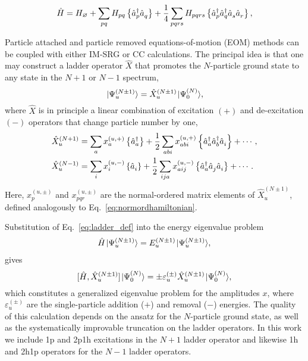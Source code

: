 \documentclass[thesis.tex]{subfiles}
\begin{document}
\begin{align}
  \hat{H} = H_\varnothing + \sum_{p q} H_{p q} \left\{\hat{a}_p^\dagger \hat{a}_q^{}\right\} + \frac{1}{4} \sum_{p q r s} H_{p q r s} \left\{\hat{a}_p^\dagger \hat{a}_q^\dagger \hat{a}_s^{} \hat{a}_r^{}\right\},
  \label{eq:normordhamiltonian}
\end{align}


Particle attached and particle removed equations-of-motion (EOM) methods can be coupled with either IM-SRG or CC calculations. The principal idea is that one may construct a ladder operator $\hat{X}$ that promotes the $N$-particle ground state to any state in the $N + 1$ or $N - 1$ spectrum,
\begin{equation}\label{eq:ladder_def}
  \hspace{1pt}\lvert \Psi^{(N \pm 1)}_u \rangle  = \hat{X}^{(N \pm 1)}_u \hspace{1pt}\lvert \Psi^{(N)}_0 \rangle,
\end{equation}
where $\hat{X}$ is in principle a linear combination of excitation $(+)$ and de-excitation $(-)$ operators that change particle number by one,
\begin{align}
  \label{eq:gen_attached}
  \hat{X}^{(N + 1)}_u &= \sum_a x^{(u, +)}_a  \left\{\hat{a}^\dagger_a\right\} + \frac{1}{2} \sum_{a b i} x^{(u, +)}_{a b i} \left\{\hat{a}^\dagger_a \hat{a}^\dagger_b \hat{a}_i^{}\right\} + \cdots,  \\
  \label{eq:gen_removed}
  \hat{X}^{(N - 1)}_u &= \sum_i x_i^{(u, -)} \left\{\hat{a}_i^{}\right\} + \frac{1}{2} \sum_{i j a} x^{(u, -)}_{a i j} \left\{\hat{a}^\dagger_a \hat{a}_j^{} \hat{a}_i^{}\right\}  + \cdots.
\end{align}
Here, $x^{(u, \pm)}_p$ and $x^{(u, \pm)}_{p q r}$ are the normal-ordered matrix elements of $\hat{X}_u^{(N \pm 1)}$, defined analogously to Eq.\ \eqref{eq:normordhamiltonian}.

Substitution of Eq.\ \eqref{eq:ladder_def} into the energy eigenvalue problem
\begin{gather*}
  \hat H \hspace{1pt}\lvert \Psi_u^{(N \pm 1)} \rangle = E^{(N\pm1)}_u \hspace{1pt}\lvert \Psi_u^{(N \pm 1)} \rangle,
\end{gather*}
gives
\begin{equation}\label{eq:EOM}
  [\hat{H}, \hat{X}^{(N \pm 1)}_u] \hspace{1pt}\lvert \Psi^{(N)}_0 \rangle = \pm \varepsilon^{(\pm)}_u \hat{X}^{(N \pm 1)}_u \hspace{1pt}\lvert \Psi^{(N)}_0 \rangle,
\end{equation}
which constitutes a generalized eigenvalue problem for the amplitudes $x$, where $\varepsilon^{(\pm)}_u$ are the single-particle addition ($+$) and removal ($-$) energies. The quality of this calculation depends on the ansatz for the $N$-particle ground state, as well as the systematically improvable truncation on the ladder operators. In this work we include 1p and 2p1h excitations in the $N + 1$ ladder operator and likewise 1h and 2h1p operators for the $N - 1$ ladder operators.
\end{document}

